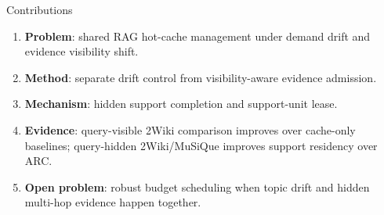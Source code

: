 \documentclass[aspectratio=169,10pt]{beamer}
\begin{document}
\begin{frame}{Contributions}
  \small
  \begin{enumerate}
    \item \textbf{Problem}: shared RAG hot-cache management under demand drift
      and evidence visibility shift.
    \item \textbf{Method}: separate drift control from visibility-aware evidence admission.
    \item \textbf{Mechanism}: hidden support completion and support-unit lease.
    \item \textbf{Evidence}: query-visible 2Wiki comparison improves over cache-only
      baselines; query-hidden 2Wiki/MuSiQue improves support residency over ARC.
    \item \textbf{Open problem}: robust budget scheduling when topic drift and
      hidden multi-hop evidence happen together.
  \end{enumerate}
\end{frame}
\end{document}
